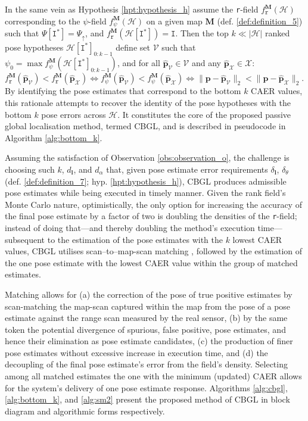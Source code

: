 In the same vein as Hypothesis \ref{hpt:hypothesis_h} assume the \texttt{r}-field
$f_{\texttt{r}}^{\bm{M}}(\mathcal{H})$ corresponding to the $\psi$-field
$f_{\psi}^{\bm{M}}(\mathcal{H})$ on a given map $\bm{M}$ (def.
\ref{def:definition_5}) such that $\Psi[\texttt{I}^{\ast}] = \Psi_\uparrow$,
and $f_{\texttt{r}}^{\bm{M}}(\mathcal{H}[\texttt{I}^{\ast}]) = \texttt{I}$.
Then the top $k \ll |\mathcal{H}|$ ranked pose hypotheses
$\mathcal{H}[\texttt{I}^{\ast}]_{0:k-1}$ define set $\mathcal{V}$ such that
$\psi_0 = \max f_{\psi}^{\bm{M}}(\mathcal{H}[\texttt{I}^{\ast}]_{0:k-1})$,
and for all $\hat{\bm{p}}_\mathcal{V} \in \mathcal{V}$
and any $\hat{\bm{p}}_{\mathcal{X}} \in \mathcal{X}$:
$ f_{\texttt{r}}^{\bm{M}}(\hat{\bm{p}}_\mathcal{V}) < f_{\texttt{r}}^{\bm{M}}(\hat{\bm{p}}_{\mathcal{X}}) \Leftrightarrow
f_{\psi}^{\bm{M}}(\hat{\bm{p}}_\mathcal{V}) < f_{\psi}^{\bm{M}}(\hat{\bm{p}}_\mathcal{X}) \Leftrightarrow
\|\bm{p}-\hat{\bm{p}}_\mathcal{V}\|_2 < \|\bm{p}-\hat{\bm{p}}_{\mathcal{X}}\|_2$.
By identifying the pose estimates that correspond to the bottom $k$ CAER
values, this rationale attempts to recover the identity of the pose hypotheses
with the bottom $k$ pose errors across $\mathcal{H}$. It constitutes the core
of the proposed passive global localisation method, termed CBGL, and is
described
in pseudocode in Algorithm \ref{alg:bottom_k}.

Assuming the satisfaction of Observation \ref{obs:observation_o}, the challenge
is choosing such $k$, $d_{\bm{l}}$, and $d_\alpha$ that, given pose estimate
error requirements $\delta_{\bm{l}}$, $\delta_{\theta}$ (def.
\ref{def:definition_7}; hyp.  \ref{hpt:hypothesis_h}), CBGL produces admissible
pose estimates while being executed in timely manner.  Given the rank field's
Monte Carlo nature, optimistically, the only option for increasing the accuracy
of the final pose estimate by a factor of two is doubling the densities of the
\texttt{r}-field; instead of doing that---and thereby doubling the method's
execution time---subsequent to the estimation of the pose estimates with the
$k$ lowest CAER values, CBGL utilises scan--to--map-scan matching
\cite{Vasiljevic2016c,Filotheou2023a}, followed by the estimation of the one
pose estimate with the lowest CAER value within the group of matched estimates.

Matching allows for (a) the correction of the pose of true positive estimates
by scan-matching the map-scan captured within the map from the pose of a pose
estimate against the range scan measured by the real sensor, (b) by the same
token the potential divergence of spurious, false positive, pose estimates, and
hence their elimination as pose estimate candidates, (c) the production of
finer pose estimates without excessive increase in execution time, and (d) the
decoupling of the final pose estimate's error from the field's density.
Selecting among all matched estimates the one with the minimum (updated) CAER
allows for the system's delivery of one pose estimate response.
Algorithms \ref{alg:cbgl}, \ref{alg:bottom_k}, and \ref{alg:sm2} present the
proposed method of CBGL in block diagram and algorithmic forms respectively.

